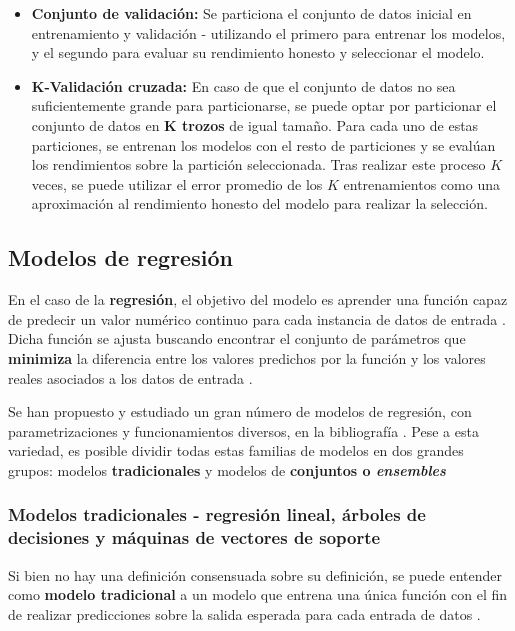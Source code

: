 \begin{itemize}
	\item \textbf{Conjunto de validación:} Se particiona el conjunto de datos inicial en entrenamiento y validación - utilizando el primero para entrenar los modelos, y el segundo para evaluar su rendimiento honesto y seleccionar el modelo.
	\item \textbf{K-Validación cruzada:} En caso de que el conjunto de datos no sea suficientemente grande para particionarse, se puede optar por particionar el conjunto de datos en \textbf{K trozos} de igual tamaño. Para cada uno de estas particiones, se entrenan los modelos con el resto de particiones y se evalúan los rendimientos sobre la partición seleccionada. Tras realizar este proceso $K$ veces, se puede utilizar el error promedio de los $K$ entrenamientos como una aproximación al rendimiento honesto del modelo para realizar la selección.
\end{itemize}

\subsection{Modelos de regresión}

En el caso de la \textbf{regresión}, el objetivo del modelo es aprender una función capaz de predecir un valor numérico continuo para cada instancia de datos de entrada \cite{mlprobabilistic}. Dicha función se ajusta buscando encontrar el conjunto de parámetros que \textbf{minimiza} la diferencia entre los valores predichos por la función y los valores reales asociados a los datos de entrada \cite{Burkov2019TheHM}.

Se han propuesto y estudiado un gran número de modelos de regresión, con parametrizaciones y funcionamientos diversos, en la bibliografía \cite{tai2021surveyregressionalgorithmsconnections}. Pese a esta variedad, es posible dividir todas estas familias de modelos en dos grandes grupos: modelos \textbf{tradicionales} y modelos de \textbf{conjuntos o \textit{ensembles}} \cite{aima}

\subsubsection{Modelos tradicionales - regresión lineal, árboles de decisiones y máquinas de vectores de soporte}

Si bien no hay una definición consensuada sobre su definición, se puede entender como \textbf{modelo tradicional} a un modelo que entrena una única función con el fin de realizar predicciones sobre la salida esperada para cada entrada de datos \cite{aima}.

